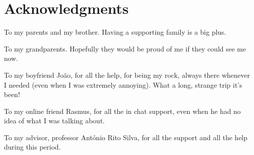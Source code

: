 
\chapter*{Acknowledgments}

To my parents and my brother. Having a supporting family is a big plus. 

To my grandparents. Hopefully they would be proud of me if they could see me now.

To my boyfriend Jo\~{a}o, for all the help, for being my rock, always there whenever I needed (even when I was extremely annoying). What a long, strange trip it's been!

To my online friend Rasmus, for all the in chat support, even when he had no idea of what I was talking about.

To my advisor, professor Ant\'{o}nio Rito Silva, for all the support and all the help during this period.


